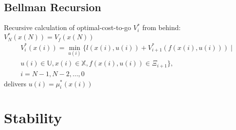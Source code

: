 \documentclass[english]{latex4ei/latex4ei_sheet}
\begin{document}
\begin{sectionbox}

\subsection{Bellman Recursion}
Recursive calculation of optimal-cost-to-go $V_i^*$ from behind: \\
$V_{N}^{*}(x(N))=V_f(x(N))$
\begin{multline*}
V_{i}^{*}(x(i))=\min _{u(i)}\Big\{l(x(i), u(i))+V_{i+1}^{*}\left(f(x(i), u(i))\right) \;| \\u(i) \in \mathbb{U}, x(i) \in \mathbb{X}, f(x(i), u(i)) \in \Xi_{i+1}\Big\},\\
i=N-1,N-2,\ldots,0
\end{multline*}
delivers $u(i)=\mu_{i}^{*}(x(i))$

\section{Stability}


\end{sectionbox}
\end{document}

